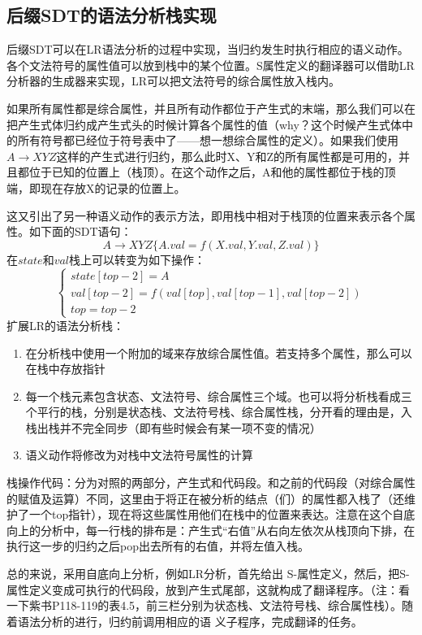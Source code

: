 \documentclass[]{report}
\begin{document}
		\subsection{后缀SDT的语法分析栈实现}
		后缀SDT可以在LR语法分析的过程中实现，当归约发生时执行相应的语义动作。各个文法符号的属性值可以放到栈中的某个位置。S属性定义的翻译器可以借助LR分析器的生成器来实现，LR可以把文法符号的综合属性放入栈内。\par
		如果所有属性都是综合属性，并且所有动作都位于产生式的末端，那么我们可以在把产生式体归约成产生式头的时候计算各个属性的值（why？这个时候产生式体中的所有符号都已经位于符号表中了——想一想综合属性的定义）。如果我们使用$A\to XYZ$这样的产生式进行归约，那么此时X、Y和Z的所有属性都是可用的，并且都位于已知的位置上（栈顶）。在这个动作之后，A和他的属性都位于栈的顶端，即现在存放X的记录的位置上。\par
		这又引出了另一种语义动作的表示方法，即用栈中相对于栈顶的位置来表示各个属性。如下面的SDT语句：
		\[A\to XYZ\{A.val=f(X.val,Y.val,Z.val)\}\]
		在$state$和$val$栈上可以转变为如下操作：
		\[\begin{cases}
			state[top-2]=A\\
			val[top-2]=f(val[top],val[top-1],val[top-2])\\
			top=top-2
		\end{cases}\]
		扩展LR的语法分析栈：
		\begin{enumerate}
			\item 在分析栈中使用一个附加的域来存放综合属性值。若支持多个属性，那么可以在栈中存放指针
			\item 每一个栈元素包含状态、文法符号、综合属性三个域。也可以将分析栈看成三个平行的栈，分别是状态栈、文法符号栈、综合属性栈，分开看的理由是，入栈出栈并不完全同步（即有些时候会有某一项不变的情况）
			\item 语义动作将修改为对栈中文法符号属性的计算
		\end{enumerate}\par
		栈操作代码：分为对照的两部分，产生式和代码段。和之前的代码段（对综合属性的赋值及运算）不同，这里由于将正在被分析的结点（们）的属性都入栈了（还维护了一个top指针），现在将这些属性用他们在栈中的位置来表达。注意在这个自底向上的分析中，每一行栈的排布是：产生式“右值”从右向左依次从栈顶向下排，在执行这一步的归约之后pop出去所有的右值，并将左值入栈。\par
		总的来说，采用自底向上分析，例如LR分析，首先给出 S-属性定义，然后，把S-属性定义变成可执行的代码段，放到产生式尾部，这就构成了翻译程序。（注：看一下紫书P118-119的表4.5，前三栏分别为状态栈、文法符号栈、综合属性栈）。随着语法分析的进行，归约前调用相应的语 义子程序，完成翻译的任务。
\end{document}
